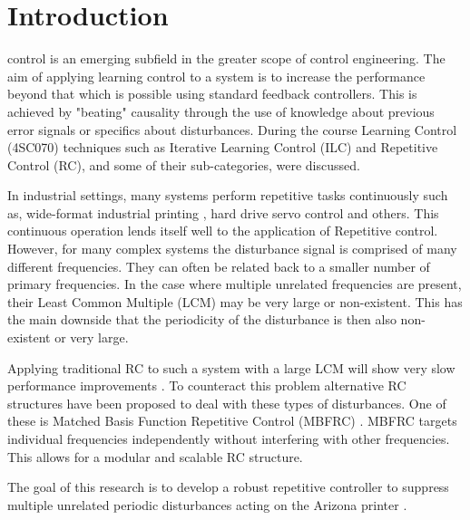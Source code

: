 \documentclass[journal]{IEEEtran}
\begin{document}
\section{Introduction}
% 
% 
% 
 control is an emerging subfield in the greater scope of control engineering. The aim of applying learning control to a system is to increase the performance beyond that which is possible using standard feedback controllers. This is achieved by "beating" causality through the use of knowledge about previous error signals or specifics about disturbances. During the course Learning Control (4SC070) techniques such as Iterative Learning Control (ILC) and Repetitive Control (RC), and some of their sub-categories, were discussed.

In industrial settings, many systems perform repetitive tasks continuously such as, wide-format industrial printing \cite{bevers_research_nodate}, hard drive servo control \cite{noauthor_iterative_nodate} and others. This continuous operation lends itself well to the application of Repetitive control. However, for many complex systems the disturbance signal is comprised of many different frequencies. They can often be related back to a smaller number of primary frequencies. In the case where multiple unrelated frequencies are present, their Least Common Multiple (LCM) may be very large or non-existent. This has the main downside that the periodicity of the disturbance is then also non-existent or very large.

Applying traditional RC to such a system with a large LCM will show very slow performance improvements \cite{luo_repetitive_2016}. To counteract this problem alternative RC structures have been proposed to deal with these types of disturbances. One of these is Matched Basis Function Repetitive Control (MBFRC) \cite{nagashima_analysis_2004}. MBFRC targets individual frequencies independently without interfering with other frequencies. This allows for a modular and scalable RC structure.

The goal of this research is to develop a robust repetitive controller to suppress multiple unrelated periodic disturbances acting on the Arizona printer \cite{Challenge_description}.
\end{document}
